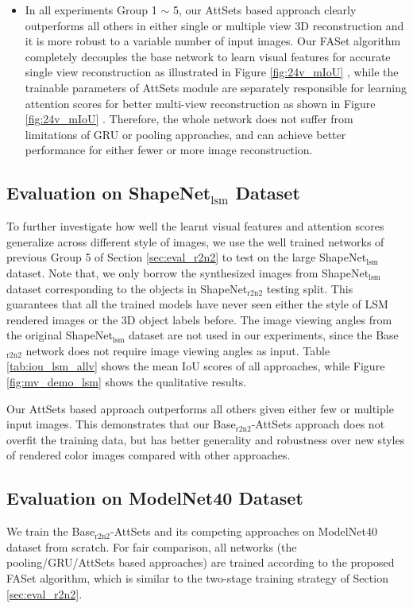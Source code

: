 \documentclass[twocolumn]{svjour3}    \pdfoutput=1
\newcommand{\nickname}{AttSets}
\newcommand{\faset}{FASet}
\newcommand{\rev}{}
\newcommand*\circled[1]{\tikz[baseline=(char.base)]{
            \node[shape=circle,draw,inner sep=0.1pt] (char) {#1};}}
\begin{document}
\begin{itemize}[leftmargin=0.3cm]
\item In all experiments Group 1 $\sim$ 5, our \nickname{} based approach clearly outperforms all others in either single or multiple view 3D reconstruction and it is more robust to a variable number of input images. Our \faset{} algorithm completely decouples the base network to learn visual features for accurate single view reconstruction as illustrated in Figure \ref{fig:24v_mIoU} \circled{3}, while the trainable parameters of \nickname{} module are separately responsible for learning attention scores for better multi-view reconstruction as shown in Figure \ref{fig:24v_mIoU} \circled{4}. Therefore, the whole network does not suffer from limitations of GRU or pooling approaches, and can achieve better performance for either fewer or more image reconstruction.
\end{itemize}

\vspace{-0.45cm}
\subsection{Evaluation on ShapeNet$_{\textrm{lsm}}$ Dataset}\label{sec:eval_lsm}
To further investigate how well the learnt visual features and attention scores generalize across different style of images, we use the well trained networks of previous Group 5 of Section \ref{sec:eval_r2n2} to test on the large ShapeNet$_{\textrm{lsm}}$ dataset. Note that, we only borrow the synthesized images from ShapeNet$_{\textrm{lsm}}$ dataset corresponding to the objects in ShapeNet$_{\textrm{r2n2}}$ testing split. This guarantees that all the trained models have never seen either the style of LSM rendered images or the 3D object labels before. The image viewing angles from the original ShapeNet$_{\textrm{lsm}}$ dataset are not used in our experiments, since the Base$_{\textrm{r2n2}}$ network does not require image viewing angles as input. Table \ref{tab:iou_lsm_allv} shows the mean IoU scores of all approaches, while Figure \ref{fig:mv_demo_lsm} shows the qualitative results. 

Our \nickname{} based approach outperforms all others given either few or multiple input images. This demonstrates that our Base$_{\textrm{r2n2}}$-AttSets approach does not overfit the training data, but has better generality and robustness over new styles of rendered color images compared with other approaches.

\vspace{-0.45cm}
\subsection{Evaluation on ModelNet40 Dataset}\label{sec:eval_modelnet40}
We train the Base$_{\textrm{r2n2}}$-AttSets and its competing approaches on ModelNet40 dataset from scratch. For fair comparison, all networks \rev{(the pooling/GRU/\nickname{} based approaches)} are trained according to the proposed \faset{} algorithm, which is similar to the two-stage training strategy of Section \ref{sec:eval_r2n2}. 
\end{document}
